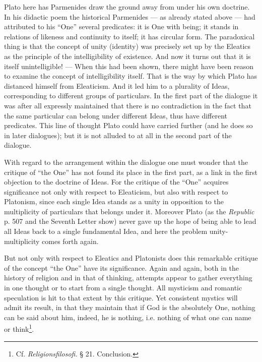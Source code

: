 \documentclass[12pt,a4paper,openany]{book}
\newcommand{\opage}[1]{\marginnote{\footnotesize\textit{[#1]}}}
\begin{document}
Plato here has Parmenides draw the ground away from under
his own doctrine. In his didactic poem the historical Parmenides
--- as already stated above --- had attributed to his ``One''
several predicates: it is One with being; it stands in relations of likeness
and continuity to itself; it has circular form.
The paradoxical thing is that the concept of unity (identity) was precisely
set up by the Eleatics as the principle of the intelligibility of existence.
And now it turns out that it is itself unintelligible!
--- When this had been shown, there might have been reason
to examine the concept of intelligibility itself. That is the
way by which Plato has distanced himself from Eleaticism. And
it led him to a plurality of Ideas, corresponding to different
groups of particulars. In the first part of the dialogue it was after all
expressly maintained that there is no contradiction in the fact that the same
particular can belong under different Ideas, thus have
different predicates. This line of thought Plato could
have carried further (and he does so in later dialogues); but
it is not alluded to at all in the second part of the dialogue.

With regard to the arrangement within the dialogue one must
wonder that the critique of ``the One'' has not found
its place in the first part, as a link in the first objection to
the doctrine of Ideas. For the critique of the ``One'' acquires significance
not only with respect to Eleaticism, but also with respect to Platonism,
since each single Idea stands as a unity in opposition to the
multiplicity of particulars that belongs under it. Moreover
Plato (as the \textit{Republic} p. 507 and the Seventh Letter
show) never gave up the hope of being able to lead all Ideas
\setcounter{footnote}{0}%
\opage{32}back to a single fundamental Idea, and here the problem
unity-multiplicity comes forth again.

But not only with respect to Eleatics and Platonists does this
remarkable critique of the concept ``the One'' have its significance.
Again and again, both in the history of religion and in that of thinking,
attempts appear to gather everything in one thought or
to start from a single thought. All mysticism and romantic
speculation is hit to that extent by this critique. Yet
consistent mystics will admit its result, in that
they maintain that if God is the absolutely One, nothing can be
said about him, indeed, he is nothing, i.e. nothing of what one
can name or think\footnote[1]{Cf. \textit{Religionsfilosofi.} § 21. Conclusion.}.
\end{document}
